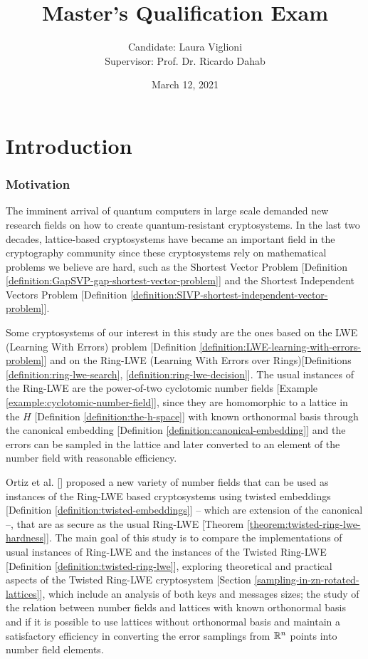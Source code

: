 \documentclass[a4paper,12pt]{article}
\author{Candidate: Laura Viglioni \\ Supervisor: Prof. Dr. Ricardo Dahab}
\date{March 12, 2021}
\title{Master’s Qualification Exam}
\begin{document}
\maketitle

\section{Introduction}
\label{sec:org57fba64}
\subsubsection*{Motivation}
\label{sec:org94c1638}
The imminent arrival of quantum computers in large scale demanded new research fields on how to create quantum-resistant cryptosystems. In the last two decades, lattice-based cryptosystems have became an important field in the cryptography community since these cryptosystems rely on mathematical problems we believe are hard, such as the Shortest Vector Problem [Definition \ref{definition:GapSVP-gap-shortest-vector-problem}] and the Shortest Independent Vectors Problem [Definition \ref{definition:SIVP-shortest-independent-vector-problem}].

Some cryptosystems of our interest in this study are the ones based on the LWE (Learning With Errors) problem [Definition \ref{definition:LWE-learning-with-errors-problem}] and on the Ring-LWE (Learning With Errors over Rings)[Definitions \ref{definition:ring-lwe-search}, \ref{definition:ring-lwe-decision}]. The usual instances of the Ring-LWE are the power-of-two cyclotomic number fields [Example \ref{example:cyclotomic-number-field}], since they are homomorphic to a lattice in the \(H\) [Definition \ref{definition:the-h-space}]  with known orthonormal basis through the canonical embedding [Definition \ref{definition:canonical-embedding}] and the errors can be sampled in the lattice and later converted to an element of the number field with reasonable efficiency.

Ortiz et al. [\cite{Ortiz2021}] proposed a new variety of number fields that can be used as instances of the Ring-LWE based cryptosystems using twisted embeddings [Definition \ref{definition:twisted-embeddings}] -- which are extension of the canonical --, that are as secure as the usual Ring-LWE [Theorem \ref{theorem:twisted-ring-lwe-hardness}]. The main goal of this study is to compare the implementations of usual instances of Ring-LWE and the instances of the Twisted Ring-LWE [Definition \ref{definition:twisted-ring-lwe}], exploring theoretical and practical aspects of the Twisted Ring-LWE cryptosystem [Section \ref{sampling-in-zn-rotated-lattices}], which include an analysis of both keys and messages sizes; the study of the relation between number fields and lattices with known orthonormal basis and if it is possible to use lattices without orthonormal basis and maintain a satisfactory efficiency in converting the error samplings from \(\mathbb{R}^n\) points into number field elements.
\end{document}
